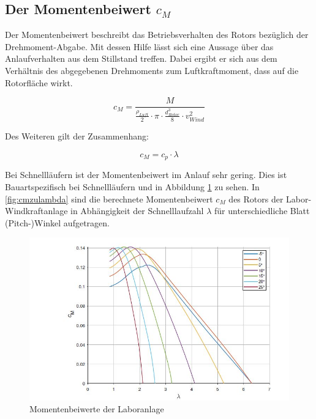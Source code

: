 \newpage
\subsection{Der Momentenbeiwert \texorpdfstring{$c_M$}{}}

Der Momentenbeiwert beschreibt das Betriebsverhalten des Rotors bezüglich der Drehmoment-Abgabe. Mit dessen Hilfe lässt sich eine Aussage über das Anlaufverhalten aus dem Stillstand treffen. Dabei ergibt er sich aus dem Verhältnis des abgegebenen Drehmoments zum Luftkraftmoment, dass auf die Rotorfläche wirkt.

\begin{equation}
  c_{M}= \frac{M}{ \frac{\rho_{Luft}}{2}\cdot \pi \cdot \frac{d^3_{Rotor}}{8} \cdot v^2_{Wind} }
    \label{eq:Momentenbeiwert_cm}
\end{equation}

Des Weiteren gilt der Zusammenhang:

\begin{equation}
  c_{M}= c_{p} \cdot \lambda
    \label{eq:Momentenbeiwert_cm2}
\end{equation}

Bei Schnellläufern ist der Momentenbeiwert im Anlauf sehr gering. Dies ist Bauartspezifisch bei Schnellläufern und in Abbildung \ref{fig:cmzulambda} zu sehen.
In \autoref{fig:cmzulambda} sind die berechnete Momentenbeiwert $c_{M}$ des Rotors der Labor-Windkraftanlage in Abhängigkeit der Schnelllaufzahl $\lambda$ für unterschiedliche Blatt (Pitch-)Winkel aufgetragen.
\begin{figure}[H]
    \centering
    \includegraphics[width=1\textwidth]{Abbildungen/cm.jpg}
    \caption{Momentenbeiwerte der Laboranlage\cite{Anleitung} }
    \label{fig:cmzulambda}
\end{figure}
\newpage
